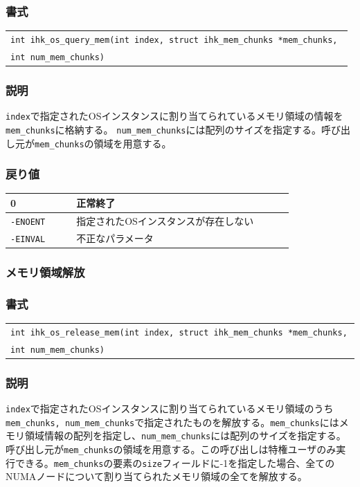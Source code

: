 \documentclass[twoside,11pt,fleqn]{book}
\begin{document}
\subsubsection*{書式}\begin{tabular}[t]{@{}l@{}}{\quad} \texttt{int ihk\_os\_query\_mem(int index, struct ihk\_mem\_chunks *mem\_chunks, }\\{\quad}{\quad}\texttt{int num\_mem\_chunks)}\end{tabular}
\subsubsection*{説明}{\quad} \texttt{index}で指定されたOSインスタンスに割り当てられているメモリ領域の情報を\texttt{mem\_chunks}に格納する。 \texttt{num\_mem\_chunks}には配列のサイズを指定する。呼び出し元が\texttt{mem\_chunks}の領域を用意する。
\subsubsection*{戻り値}
\begin{table}[!h]
\footnotesize
\begin{tabular}{|p{0.20\linewidth}|p{0.66\linewidth}|} \hline
0&正常終了\\ \hline
\texttt{-ENOENT}&指定されたOSインスタンスが存在しない\\ \hline
\texttt{-EINVAL}&不正なパラメータ\\ \hline
\end{tabular}
\vspace{-0em}
\end{table}
\FloatBarrier

\subsubsection{メモリ領域解放}
\subsubsection*{書式}\begin{tabular}[t]{@{}l@{}}{\quad} \texttt{int ihk\_os\_release\_mem(int index, struct ihk\_mem\_chunks *mem\_chunks, }\\{\quad}{\quad}\texttt{int num\_mem\_chunks)}\end{tabular}
\subsubsection*{説明}{\quad} \texttt{index}で指定されたOSインスタンスに割り当てられているメモリ領域のうち\texttt{mem\_chunks, num\_mem\_chunks}で指定されたものを解放する。\texttt{mem\_chunks}にはメモリ領域情報の配列を指定し、\texttt{num\_mem\_chunks}には配列のサイズを指定する。呼び出し元が\texttt{mem\_chunks}の領域を用意する。この呼び出しは特権ユーザのみ実行できる。\texttt{mem\_chunks}の要素の\texttt{size}フィールドに-1を指定した場合、全てのNUMAノードについて割り当てられたメモリ領域の全てを解放する。
\end{document}
